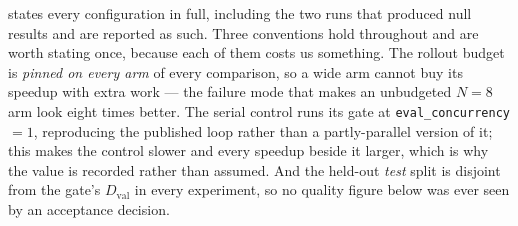 \documentclass{article}
\newcommand{\code}[1]{\texttt{#1}}
\newcommand{\Dval}{D_{\mathrm{val}}}
\begin{document}
 states every configuration in full, including the two runs that produced null results and are reported as such. Three conventions hold throughout and are worth stating once, because each of them costs us something. The rollout budget is \emph{pinned on every arm} of every comparison, so a wide arm cannot buy its speedup with extra work --- the failure mode that makes an unbudgeted $N{=}8$ arm look eight times better. The serial control runs its gate at \code{eval\_concurrency}${=}1$, reproducing the published loop rather than a partly-parallel version of it; this makes the control slower and every speedup beside it larger, which is why the value is recorded rather than assumed. And the held-out \emph{test} split is disjoint from the gate's $\Dval$ in every experiment, so no quality figure below was ever seen by an acceptance decision.
\end{document}
